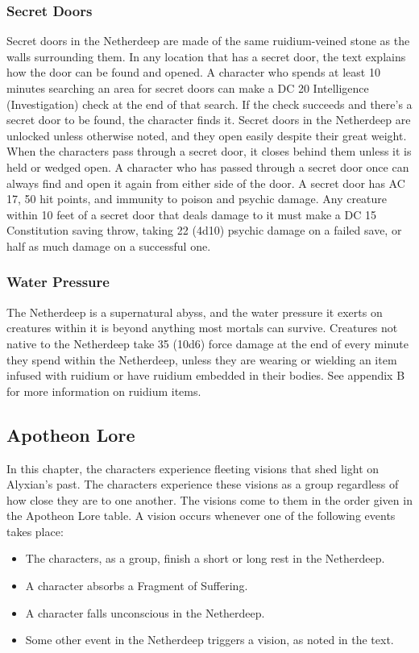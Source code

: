 \documentclass[10pt,a4,twoside,twocolumn,openany,nodeprecatedcode]{dndbook}
\begin{document}
\subsubsection{Secret Doors}
Secret doors in the Netherdeep are made of the same ruidium-veined stone as the walls surrounding them. In any location that has a secret door, the text explains how the door can be found and opened.
A character who spends at least 10 minutes searching an area for secret doors can make a DC 20 Intelligence (Investigation) check at the end of that search. If the check succeeds and there's a secret door to be found, the character finds it. Secret doors in the Netherdeep are unlocked unless otherwise noted, and they open easily despite their great weight.
When the characters pass through a secret door, it closes behind them unless it is held or wedged open. A character who has passed through a secret door once can always find and open it again from either side of the door.
A secret door has AC 17, 50 hit points, and immunity to poison and psychic damage. Any creature within 10 feet of a secret door that deals damage to it must make a DC 15 Constitution saving throw, taking 22 (4d10) psychic damage on a failed save, or half as much damage on a successful one.
\subsubsection{Water Pressure}
The Netherdeep is a supernatural abyss, and the water pressure it exerts on creatures within it is beyond anything most mortals can survive. Creatures not native to the Netherdeep take 35 (10d6) force damage at the end of every minute they spend within the Netherdeep, unless they are wearing or wielding an item infused with ruidium or have ruidium embedded in their bodies. See appendix B for more information on ruidium items.
\subsection{Apotheon Lore}
In this chapter, the characters experience fleeting visions that shed light on Alyxian's past. The characters experience these visions as a group regardless of how close they are to one another. The visions come to them in the order given in the Apotheon Lore table.
A vision occurs whenever one of the following events takes place:
\begin{itemize}

\item The characters, as a group, finish a short or long rest in the Netherdeep.
\item A character absorbs a Fragment of Suffering.
\item A character falls unconscious in the Netherdeep.
\item Some other event in the Netherdeep triggers a vision, as noted in the text.
\end{itemize}
\end{document}
